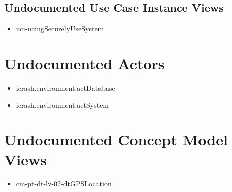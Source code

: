 \subsection[Undocumented Use Case Instance Views]{Undocumented Use Case Instance Views}
\begin{itemize}
\item uci-uciugSecurelyUseSystem 
\end{itemize}


\section[Undocumented Actors]{Undocumented Actors}
\begin{itemize}
\item icrash.environment.actDatabase 
\item icrash.environment.actSystem 
\end{itemize}














\section[Undocumented Concept Model Views]{Undocumented Concept Model Views}
\begin{itemize}
\item cm-pt-dt-lv-02-dtGPSLocation 
\end{itemize}


